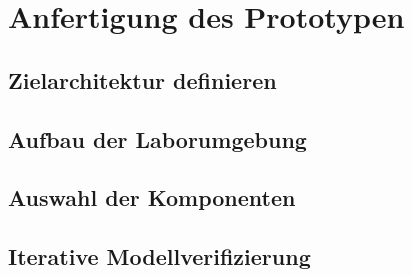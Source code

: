 \newpage
\section{Anfertigung des Prototypen}
\subsection{Zielarchitektur definieren}
\subsection{Aufbau der Laborumgebung}
\subsection{Auswahl der Komponenten}
\subsection{Iterative Modellverifizierung}